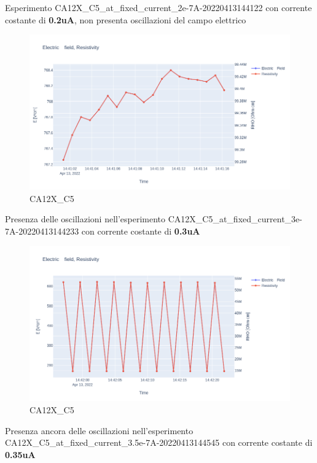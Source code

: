 \documentclass[11pt]{article}
\begin{document}
Esperimento CA12X\_C5\_at\_fixed\_current\_2e-7A-20220413144122 con
corrente costante di \textbf{0.2uA}, non presenta oscillazioni del campo
elettrico

\begin{figure}
\centering
\includegraphics{CA12X_C5-2.png}
\caption{CA12X\_C5}
\end{figure}

Presenza delle oscillazioni nell'esperimento
CA12X\_C5\_at\_fixed\_current\_3e-7A-20220413144233 con corrente
costante di \textbf{0.3uA}

\begin{figure}
\centering
\includegraphics{CA12X_C5-3.png}
\caption{CA12X\_C5}
\end{figure}

Presenza ancora delle oscillazioni nell'esperimento
CA12X\_C5\_at\_fixed\_current\_3.5e-7A-20220413144545 con corrente
costante di \textbf{0.35uA}
\end{document}
